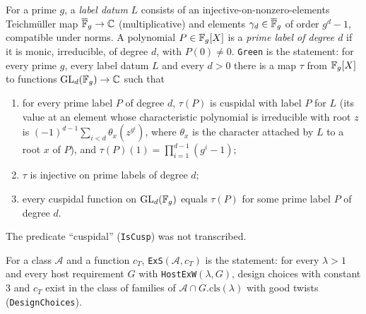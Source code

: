 \begin{definition}\label{fam:green}
For a prime $g$, a \emph{label datum} $L$ consists of an injective-on-nonzero-elements Teichm\"uller map $\overline{\mathbb{F}}_g\to\mathbb{C}$ (multiplicative) and elements $\gamma_d\in\overline{\mathbb{F}}_g$ of order $g^d-1$, compatible under norms. A polynomial $P\in\mathbb{F}_g[X]$ is a \emph{prime label of degree $d$} if it is monic, irreducible, of degree $d$, with $P(0)\ne0$. \texttt{Green} is the statement: for every prime $g$, every label datum $L$ and every $d>0$ there is a map $\tau$ from $\mathbb{F}_g[X]$ to functions $\mathrm{GL}_d(\mathbb{F}_g)\to\mathbb{C}$ such that
\begin{enumerate}
\item for every prime label $P$ of degree $d$, $\tau(P)$ is cuspidal with label $P$ for $L$ (its value at an element whose characteristic polynomial is irreducible with root $z$ is $(-1)^{d-1}\sum_{i<d}\theta_x(z^{g^i})$, where $\theta_x$ is the character attached by $L$ to a root $x$ of $P$), and $\tau(P)(1)=\prod_{i=1}^{d-1}(g^i-1)$;
\item $\tau$ is injective on prime labels of degree $d$;
\item every cuspidal function on $\mathrm{GL}_d(\mathbb{F}_g)$ equals $\tau(P)$ for some prime label $P$ of degree $d$.
\end{enumerate}
The predicate ``cuspidal'' (\texttt{IsCusp}) was not transcribed.
\end{definition}

\begin{definition}\label{fam:exs}
For a class $\mathcal A$ and a function $c_T$, \texttt{ExS}$(\mathcal A,c_T)$ is the statement: for every $\lambda>1$ and every host requirement $G$ with \texttt{HostExW}$(\lambda,G)$, design choices with constant $3$ and $c_T$ exist in the class of families of $\mathcal A\cap G.\mathrm{cls}(\lambda)$ with good twists (\texttt{DesignChoices}).
\end{definition}


